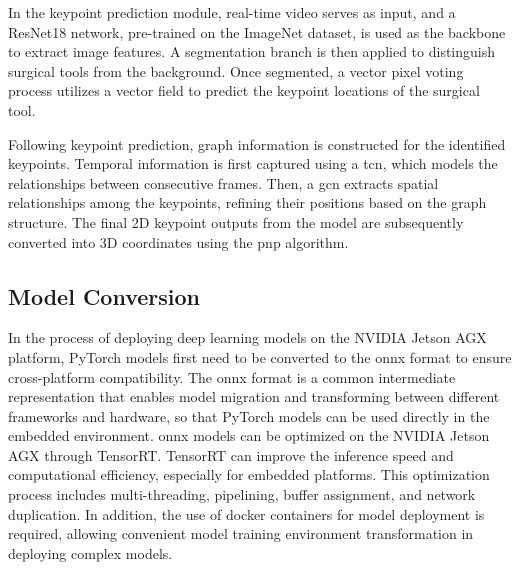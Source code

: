 \documentclass[12pt]{article}
\begin{document}
In the keypoint prediction module, real-time video serves as input, and a ResNet18 network, pre-trained on the ImageNet dataset, is used as the backbone to extract image features. A segmentation branch is then applied to distinguish surgical tools from the background. Once segmented, a vector pixel voting process utilizes a vector field to predict the keypoint locations of the surgical tool\cite{xu2023graph}.

Following keypoint prediction, graph information is constructed for the identified keypoints. Temporal information is first captured using a \gls{tcn}\cite{zeng2020srnet}, which models the relationships between consecutive frames. Then, a \gls{gcn}\cite{yan2018spatial} extracts spatial relationships among the keypoints, refining their positions based on the graph structure\cite{xu2023graph}. The final 2D keypoint outputs from the model are subsequently converted into 3D coordinates using the \gls{pnp} algorithm\cite{yun2017object}.


\subsection{Model Conversion}
In the process of deploying deep learning models on the NVIDIA Jetson AGX platform, PyTorch models first need to be converted to the \gls{onnx} format to ensure cross-platform compatibility. The \gls{onnx} format is a common intermediate representation that enables model migration and transforming between different frameworks and hardware, so that PyTorch models can be used directly in the embedded environment. \gls{onnx} models can be optimized on the NVIDIA Jetson AGX through TensorRT. TensorRT can improve the inference speed and computational efficiency, especially for embedded platforms. This optimization process includes multi-threading, pipelining, buffer assignment, and network duplication\cite{Jeong2022TensorRTBasedFA}\cite{karumbunathan2022nvidia}. In addition, the use of docker containers for model deployment is required, allowing convenient model training environment transformation in deploying complex models\cite{10283807}.
\end{document}

